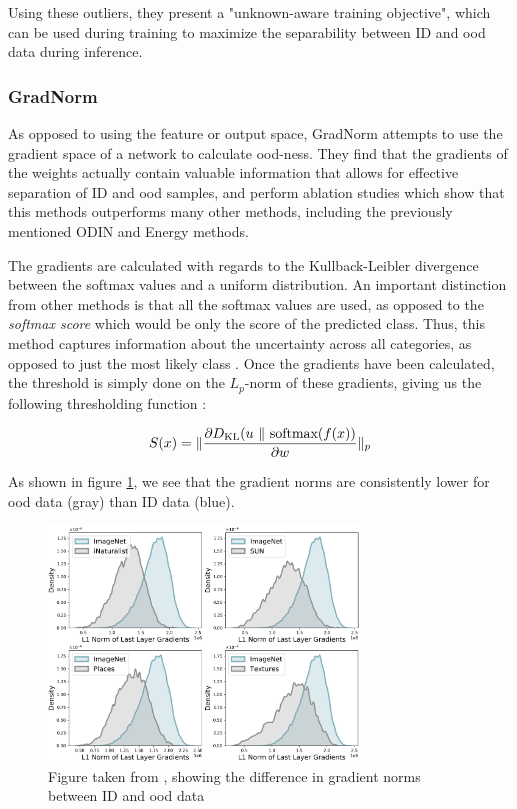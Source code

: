\documentclass[UKenglish]{uiomasterthesis} %
\theoremstyle{definition}
\begin{document}
Using these outliers, they present a "unknown-aware training objective", which can be used during training to maximize the separability between ID and \ac{ood} data during inference.
\\

\subsubsection{GradNorm}

As opposed to using the feature or output space, GradNorm \cite{gradnorm} attempts to use the gradient space of a network to calculate \ac{ood}-ness. They find that the gradients of the weights actually contain valuable information that allows for effective separation of ID and \ac{ood} samples, and perform ablation studies which show that this methods outperforms many other methods, including the previously mentioned ODIN and Energy methods.

The gradients are calculated with regards to the Kullback-Leibler divergence between the softmax values and a uniform distribution. An important distinction from other methods is that all the softmax values are used, as opposed to the {\it softmax score} which would be only the score of the predicted class. Thus, this method captures information about the uncertainty across all categories, as opposed to just the most likely class \cite[3]{gradnorm}. Once the gradients have been calculated, the threshold is simply done on the $L_p$-norm of these gradients, giving us the following thresholding function \cite{gradnorm}:

\begin{equation}
\label{eq:score}
    S(\*x) = \lVert\frac{\partial D_\text{KL}(\*u~\lVert~\text{softmax}(f(\*x))}{\partial \*w}  \rVert_p
\end{equation}

As shown in figure \ref{gradnorms}, we see that the gradient norms are consistently lower for \ac{ood} data (gray) than ID data (blue).

\begin{figure}[h]
\centerline{\includegraphics[width=3.25in]{figure/gradnorm.pdf}}
\caption{Figure taken from \cite{gradnorm}, showing the difference in gradient norms between ID and \ac{ood} data}
\label{gradnorms}
\end{figure}
\end{document}
